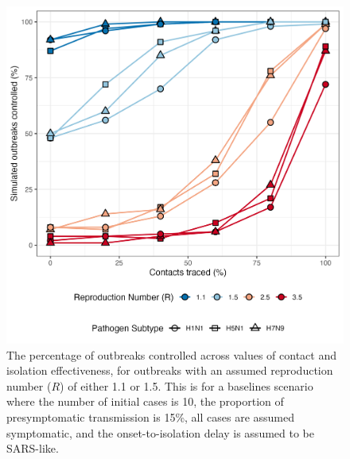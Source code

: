 \documentclass{article}
\begin{document}
\begin{figure}[ht]
\centering
\includegraphics[width=\textwidth]{../plots/prop_outbreak_control_reproduction_number.png}
\caption{The percentage of outbreaks controlled across values of contact and isolation effectiveness, for outbreaks with an assumed reproduction number ($R$) of either 1.1 or 1.5. This is for a baselines scenario where the number of initial cases is 10, the proportion of presymptomatic transmission is 15\%, all cases are assumed symptomatic, and the onset-to-isolation delay is assumed to be SARS-like.}
\label{fig:prop-outbreak-control-R}
\end{figure}

\clearpage
\end{document}
